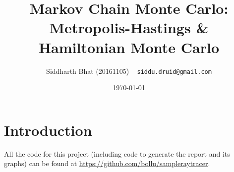 \documentclass[titlepage]{article}
\title{Markov Chain Monte Carlo:  Metropolis-Hastings \& Hamiltonian Monte Carlo }
\author{Siddharth Bhat (20161105) ~ \texttt{siddu.druid@gmail.com}}
\date{\today}
\newcommand{\N}{\mathbb{N}}
\newcommand{\R}{\mathbb{R}}
\renewcommand{\S}{\texttt{S}}
\newcommand{\zo}{\{0, 1\}}
\newcommand{\uniformbool}{\texttt{uniformbool}}
\begin{document}
\maketitle

\section{Introduction}

All the code for this project (including code to generate the report and
its graphs) can be found at \url{https://github.com/bollu/sampleraytracer}.

% 
% 
% 
% 
% 
% 
\end{document}
